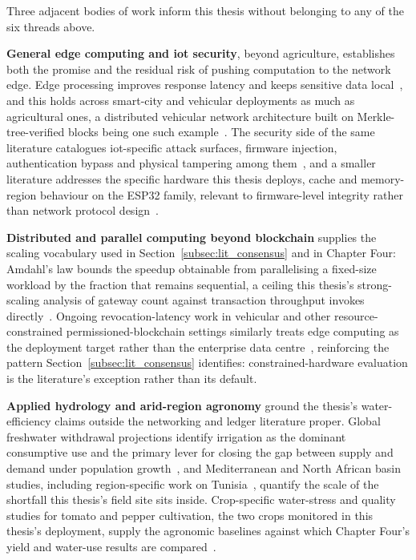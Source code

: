 \documentclass[12pt,a4paper,oneside]{book}
\begin{document}
Three adjacent bodies of work inform this thesis without belonging to any
of the six threads above.

\textbf{General edge computing and \gls{iot} security}, beyond agriculture,
establishes both the promise and the residual risk of pushing computation
to the network edge. Edge processing improves response latency and keeps
sensitive data local~\cite{sharma2020edge, liu2019edge, wang2021edge}, and
this holds across smart-city and vehicular deployments as much as
agricultural ones, a distributed vehicular network architecture built on
Merkle-tree-verified blocks being one such
example~\cite{sharma2018merkle}. The security side of the same literature
catalogues \gls{iot}-specific attack surfaces, firmware injection,
authentication bypass and physical tampering among
them~\cite{hassan2019iotSecurity, ali2022secureIOT, anderson2021iotBlockchain,
kalaimathi2025injection, akande2018iotChallenges, knight2025iotResilience,
bashir2023IoTWear}, and a smaller literature addresses the specific
hardware this thesis deploys, cache and memory-region behaviour on the
ESP32 family, relevant to firmware-level integrity rather than network
protocol design~\cite{kumari2025rom, csdn_esp32s3_cache, esp_hal_cache}.

\textbf{Distributed and parallel computing beyond blockchain} supplies the
scaling vocabulary used in Section~\ref{subsec:lit_consensus} and in
Chapter Four: Amdahl's law bounds the speedup obtainable from
parallelising a fixed-size workload by the fraction that remains
sequential, a ceiling this thesis's strong-scaling analysis of gateway
count against transaction throughput invokes
directly~\cite{amdahl1967validity}. Ongoing revocation-latency work in
vehicular and other resource-constrained permissioned-blockchain settings
similarly treats edge computing as the deployment target rather than the
enterprise data centre~\cite{lu2022revocation}, reinforcing the pattern
Section~\ref{subsec:lit_consensus} identifies: constrained-hardware
evaluation is the literature's exception rather than its default.

\textbf{Applied hydrology and arid-region agronomy} ground the thesis's
water-efficiency claims outside the networking and ledger literature
proper. Global freshwater withdrawal projections identify irrigation as
the dominant consumptive use and the primary lever for closing the gap
between supply and demand under
population growth~\cite{fao2050, un_water2023}, and Mediterranean and North
African basin studies, including region-specific work on
Tunisia~\cite{tunisia_water_report, adeloye2021tunisiaAgro,
benali2024tunisiaWater, shanhong2021water}, quantify the scale of the
shortfall this thesis's field site sits inside. Crop-specific water-stress
and quality studies for tomato and pepper cultivation, the two crops
monitored in this thesis's deployment, supply the agronomic baselines
against which Chapter Four's yield and water-use results are
compared~\cite{mdpi_tunisia_tomato, jaeid_pepper, fao_tomato_guide,
safeer2024tomato, wang2025pepper, tia2020waterstress,
pepper2021moisturecontrol, capsicumspacing2017study, precision2020yield,
pepperquality2019irrigation}.
\end{document}
